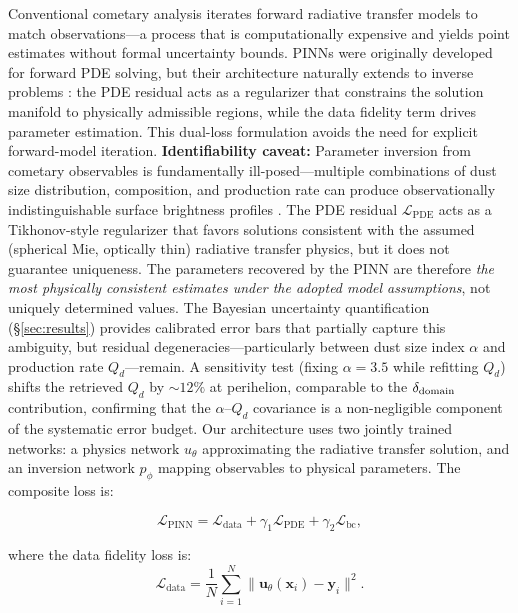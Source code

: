 \documentclass[preprint2]{aastex631}
\begin{document}
Conventional cometary analysis iterates forward radiative transfer models to match observations---a process that is computationally expensive and yields point estimates without formal uncertainty bounds. PINNs \citep{raissi19} were originally developed for forward PDE solving, but their architecture naturally extends to inverse problems \citep{lu21}: the PDE residual acts as a regularizer that constrains the solution manifold to physically admissible regions, while the data fidelity term drives parameter estimation. This dual-loss formulation avoids the need for explicit forward-model iteration. \textbf{Identifiability caveat:} Parameter inversion from cometary observables is fundamentally ill-posed---multiple combinations of dust size distribution, composition, and production rate can produce observationally indistinguishable surface brightness profiles \citep{fulle10}. The PDE residual $\mathcal{L}_{\text{PDE}}$ acts as a Tikhonov-style regularizer that favors solutions consistent with the assumed (spherical Mie, optically thin) radiative transfer physics, but it does not guarantee uniqueness. The parameters recovered by the PINN are therefore \textit{the most physically consistent estimates under the adopted model assumptions}, not uniquely determined values. The Bayesian uncertainty quantification (§\ref{sec:results}) provides calibrated error bars that partially capture this ambiguity, but residual degeneracies---particularly between dust size index $\alpha$ and production rate $Q_d$---remain. A sensitivity test (fixing $\alpha = 3.5$ while refitting $Q_d$) shifts the retrieved $Q_d$ by $\sim 12\%$ at perihelion, comparable to the $\delta_{\rm domain}$ contribution, confirming that the $\alpha$--$Q_d$ covariance is a non-negligible component of the systematic error budget. Our architecture uses two jointly trained networks: a physics network $u_\theta$ approximating the radiative transfer solution, and an inversion network $p_\phi$ mapping observables to physical parameters. The composite loss is:

\begin{equation}\label{eq:pinn_loss}
\mathcal{L}_{\text{PINN}} = \mathcal{L}_{\text{data}} + \gamma_1 \mathcal{L}_{\text{PDE}} + \gamma_2 \mathcal{L}_{\text{bc}},
\end{equation}

where the data fidelity loss is:
\begin{equation}\label{eq:data_loss}
\mathcal{L}_{\text{data}} = \frac{1}{N} \sum_{i=1}^{N} \|\mathbf{u}_\theta(\mathbf{x}_i) - \mathbf{y}_i\|^2.
\end{equation}
\end{document}
